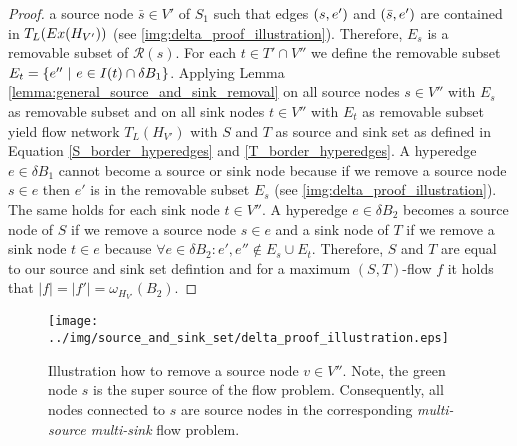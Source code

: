 \begin{proof}
a source node $\bar{s} \in V'$ of $S_1$ such that edges $(s,e')$ and $(\bar{s},e')$
are contained in $T_L(Ex(H_{V'}))$ (see \autoref{img:delta_proof_illustration}). Therefore, $E_s$ is a removable subset of $\mathcal{R}(s)$.
For each $t \in T' \cap V''$ we define the removable subset $E_t = \{e''\ |\ e \in I(t) \cap \delta B_1\}$.
Applying Lemma \ref{lemma:general_source_and_sink_removal} on all source nodes $s \in V''$
with $E_s$ as removable subset and on all sink nodes $t \in V''$ with $E_t$ 
as removable subset yield flow network $T_L(H_{V'})$ with $S$ and $T$ as source and sink 
set as defined in Equation \ref{S_border_hyperedges} and \ref{T_border_hyperedges}.
A hyperedge $e \in \delta B_1$ cannot become a source or sink node because if we remove a 
source node $s \in e$ then $e'$ is in the removable subset $E_s$ (see \autoref{img:delta_proof_illustration}). The same holds
for each sink node $t \in V''$. A hyperedge $e \in \delta B_2$ becomes a source node of $S$
if we remove a source node $s \in e$ and a sink node of $T$ if we remove a 
sink node $t \in e$ because $\forall e \in \delta B_2: e',e'' \notin E_s \cup E_t$. 
Therefore, $S$ and $T$ are equal to our source and sink set defintion and
for a maximum $(S,T)$-flow $f$ it holds that $|f| = |f'| = \omega_{H_{V'}}(B_2)$.
\end{proof}

\begin{figure}
\centering
\texttt{[image: ../img/source\_and\_sink\_set/delta\_proof\_illustration.eps]}
\caption{Illustration how to remove a source node $v \in V''$. Note, the green node $s$
         is the super source of the flow problem. Consequently, all nodes connected to $s$
         are source nodes in the corresponding \emph{multi-source multi-sink} flow problem.}
\label{img:delta_proof_illustration}
\end{figure}



